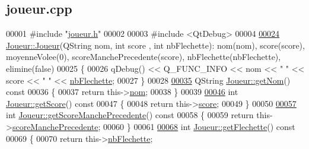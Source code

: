 \hypertarget{joueur_8cpp_source}{}\subsection{joueur.\+cpp}

\begin{DoxyCode}
00001 \textcolor{preprocessor}{#include "\hyperlink{joueur_8h}{joueur.h}"}
00002 
00003 \textcolor{preprocessor}{#include <QtDebug>}
00004 
\hyperlink{class_joueur_a3832d331fb872c978f7a2d890b024b4c}{00024} \hyperlink{class_joueur_a3832d331fb872c978f7a2d890b024b4c}{Joueur::Joueur}(QString nom, \textcolor{keywordtype}{int} score , \textcolor{keywordtype}{int} nbFlechette): nom(nom), score(score), 
      moyenneVolee(0), scoreManchePrecedente(score), nbFlechette(nbFlechette), elimine(false)
00025 \{
00026     qDebug() << Q\_FUNC\_INFO << nom << \textcolor{stringliteral}{" "} << score << \textcolor{stringliteral}{" "} << \hyperlink{class_joueur_a330099a1952fbf97b2faea2c640b32f5}{nbFlechette};
00027 \}
00028 
\hyperlink{class_joueur_a1d7082ab1f926eae1bd6834e901751a7}{00035} QString \hyperlink{class_joueur_a1d7082ab1f926eae1bd6834e901751a7}{Joueur::getNom}()\textcolor{keyword}{ const}
00036 \textcolor{keyword}{}\{
00037     \textcolor{keywordflow}{return} this->\hyperlink{class_joueur_ab06d7f1e6b482299bb03919e0cd2166d}{nom};
00038 \}
00039 
\hyperlink{class_joueur_adf4397ffb7fcc340c2d2cc6c45edc8e2}{00046} \textcolor{keywordtype}{int} \hyperlink{class_joueur_adf4397ffb7fcc340c2d2cc6c45edc8e2}{Joueur::getScore}()\textcolor{keyword}{ const}
00047 \textcolor{keyword}{}\{
00048     \textcolor{keywordflow}{return} this->\hyperlink{class_joueur_a680896b9ff71c2762ae653ef6aa7c8ce}{score};
00049 \}
00050 
\hyperlink{class_joueur_ade4640f21e0f3c30390bda7d25b748fa}{00057} \textcolor{keywordtype}{int} \hyperlink{class_joueur_ade4640f21e0f3c30390bda7d25b748fa}{Joueur::getScoreManchePrecedente}()\textcolor{keyword}{ const}
00058 \textcolor{keyword}{}\{
00059     \textcolor{keywordflow}{return} this->\hyperlink{class_joueur_ac78f2e83781d2bdeb9a613dc37812736}{scoreManchePrecedente};
00060 \}
00061 
\hyperlink{class_joueur_a6a9730a4653b10e507c32715920bdea5}{00068} \textcolor{keywordtype}{int} \hyperlink{class_joueur_a6a9730a4653b10e507c32715920bdea5}{Joueur::getFlechette}()\textcolor{keyword}{ const}
00069 \textcolor{keyword}{}\{
00070     \textcolor{keywordflow}{return} this->\hyperlink{class_joueur_a330099a1952fbf97b2faea2c640b32f5}{nbFlechette};

\end{DoxyCode}
